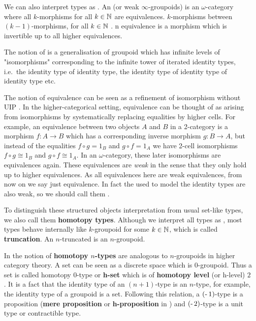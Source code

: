 We can also interpret types as \textbf{\og}. 
An \ogs (or weak $\infty$-groupoids) is an $\omega$-category where all $k$-morphisms for all $k \in \mathbb{N}$ are equivalences. $k$-morphisms between $(k - 1)$-morphisms, for all $k \in \mathbb{N}$ . n equivalence is a morphism which is invertible up to all higher equivalences. 

The notion of \ogs is a generalisation of groupoid which has infinite levels of "isomorphisms" corresponding to the infinite tower of iterated identity types, i.e.\ the identity type of identity type, the identity type of identity type of identity type etc.

The notion of equivalence can be seen as a refinement of isomorphism without UIP \cite{txa:csl}. 
In the higher-categorical setting, equivalence can be thought of as arising from isomorphisms by systematically replacing equalities by higher cells.
For example, an equivalence 
between two objects $A$ and $B$ in a 2-category is a morphism $f : A \rightarrow B$ which has a
corresponding inverse morphism $ g : B \rightarrow A$, but instead of the
equalities $f ∘ g = 1_B$ and $g ∘ f = 1_A$ we have 2-cell isomorphisms $f ∘ g ≅ 1_B$ and $g ∘ f ≅ 1_A$. In an $\omega$-category, these later isomorphisms are equivalences again.
These equivalences are \emph{weak} in the sense that they only hold up to higher equivalences. 
As all equivalences here are weak equivalences, from now on we say just equivalence.
In fact the \og used to model the identity types are also weak, so we should call them \textbf{\wog}.



To distinguish these structured objects interpretation from usual set-like types, we also call them \textbf{homotopy types}. Although we interpret all types as \og, most types behave internally like $k$-groupoid for some $k \in \mathbb{N}$, which is called \textbf{truncation}. An $n$-truncated \ogs is an $n$-groupoid.

In \hott the notion of \textbf{homotopy $n$-types} are analogous to $n$-groupoids in higher category theory. A set can be seen as a discrete space which is $0$-groupoid. Thus a set is called homotopy $0$-type or \textbf{h-set} which is of \textbf{homotopy level} (or h-level) $2$. It is a fact that the identity type of an $(n+1)$-type is an $n$-type, for example, the identity type of a groupoid is a set. Following this relation, a $(\operatorname{\text{-}} 1)$-type is a proposition (\textbf{mere proposition} or \textbf{h-proposition} in \hott) and $(\operatorname{\text{-}} 2)$-type is a unit type or contractible type.

